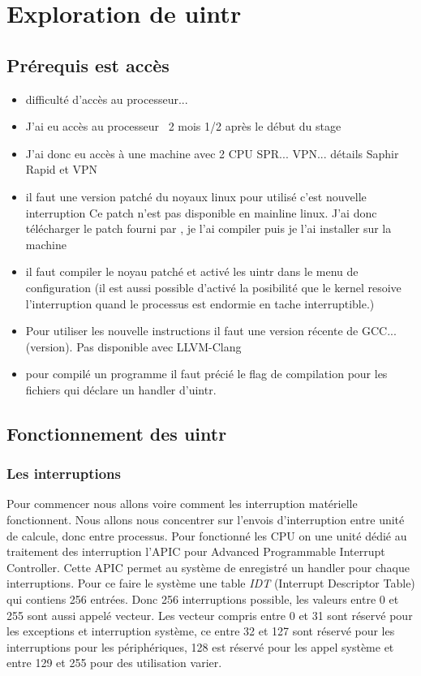 \section{Exploration de uintr}

\subsection{Prérequis est accès}

\begin{itemize}
  \item difficulté d'accès au processeur...
  \item J'ai eu accès au processeur ~2 mois 1/2 après le début du stage
  \item J'ai donc eu accès à une machine avec 2 CPU SPR... VPN... détails Saphir Rapid et VPN
  \item il faut une version patché du noyaux linux pour utilisé c'est nouvelle interruption
  Ce patch n'est pas disponible en mainline linux.
  J'ai donc télécharger le patch fourni par \intel{}, je l'ai compiler puis je l'ai installer sur la machine
  \item il faut compiler le noyau patché et activé les uintr dans le menu de configuration (il est aussi possible d'activé la posibilité que le kernel resoive l'interruption quand le processus est endormie en tache interruptible.)
  \item Pour utiliser les nouvelle instructions il faut une version récente de GCC... (version).
  Pas disponible avec LLVM-Clang
  \item pour compilé un programme il faut précié le flag de compilation  pour les fichiers qui déclare un handler d'uintr.
\end{itemize}

\subsection{Fonctionnement des uintr}

\subsubsection{Les interruptions}

Pour commencer nous allons voire comment les interruption matérielle fonctionnent.
Nous allons nous concentrer sur l'envois d'interruption entre unité de calcule, donc entre processus.
Pour fonctionné les CPU on une unité dédié au traitement des interruption l'APIC pour Advanced Programmable Interrupt Controller.
Cette APIC permet au système de enregistré un handler pour chaque interruptions.
Pour ce faire le système une table \emph{IDT} (Interrupt Descriptor Table) qui contiens 256 entrées.
Donc 256 interruptions possible, les valeurs entre 0 et 255 sont aussi appelé vecteur.
Les vecteur compris entre 0 et 31 sont réservé pour les exceptions et interruption système, ce entre 32 et 127 sont réservé pour les interruptions pour les périphériques,
128 est réservé pour les appel système et entre 129 et 255 pour des utilisation varier.

